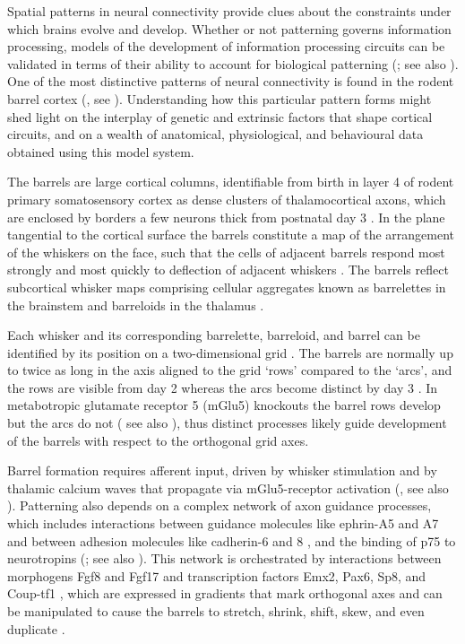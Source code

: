 \documentclass[a4paper,11pt]{article}
\begin{document}
Spatial patterns in neural connectivity provide clues about the constraints
under which brains evolve and develop. Whether or not patterning governs
information processing, models of the development of information processing
circuits can be validated in terms of their ability to account for biological
patterning (\citealp{purves_iterated_1992}; see also
\citealp{wilson_what_2015,bednar_cortical_2016}). One of the most distinctive patterns of
neural connectivity is found in the rodent barrel cortex
(\citealp{woolsey_pattern_1948,woolsey_structural_1970,welker_structure_1974}, see
\citealp{Fox2008}). Understanding how this particular pattern forms might shed
light on the interplay of genetic and extrinsic factors that shape cortical
circuits, and on a wealth of anatomical, physiological, and behavioural data
obtained using this model system.

The barrels are large cortical columns, identifiable from birth in layer 4 of
rodent primary somatosensory cortex as dense clusters of thalamocortical
axons, which are enclosed by borders a few neurons thick from postnatal day 3
\citep{Erzurumlu2012}. In the plane tangential to the cortical surface the
barrels constitute a map of the arrangement of the whiskers on the face, such
that the cells of adjacent barrels respond most strongly and most quickly to
deflection of adjacent whiskers \citep{Armstrong-James1992}. The barrels
reflect subcortical whisker maps comprising cellular aggregates known as
barrelettes in the brainstem and barreloids in the thalamus
\citep{Killackey1980}.

Each whisker and its corresponding barrelette, barreloid, and barrel can be
identified by its position on a two-dimensional grid
\citep{Zucker1969,Killackey1980,Loos1976}. The barrels are normally up to
twice as long in the axis aligned to the grid ‘rows’ compared to the ‘arcs’,
and the rows are visible from day 2 \citep{Rebsam2002} whereas the arcs become
distinct by day 3 \citep{Erzurumlu2012,Rebsam2002}. In metabotropic glutamate
receptor 5 (mGlu5) knockouts the barrel rows develop but the arcs do not
(\citealp{Hannan2001} see also \citealp{Fox2008}), thus distinct processes
likely guide development of the barrels with respect to the orthogonal grid
axes.

Barrel formation requires afferent input, driven by whisker stimulation and by
thalamic calcium waves that propagate via mGlu5-receptor activation
(\citealp{Anton2019}, see also \citealp{Anton2018}). Patterning also depends
on a complex network of axon guidance processes, which includes interactions
between guidance molecules like ephrin-A5 and A7 \citep{Miller2006} and
between adhesion molecules like cadherin-6 and 8 \citep{greig_molecular_2013,Bishop2000},
and the binding of p75 to neurotropins (\citealp{Shimogori2005,Bishop2002};
see also \citealp{Dye2011a,Dye2011b}). This network is orchestrated by
interactions between morphogens Fgf8 and Fgf17 and transcription factors Emx2,
Pax6, Sp8, and Coup-tf1 \citep{Shimogori2005,Bishop2000}, which are expressed
in gradients that mark orthogonal axes and can be manipulated to cause the
barrels to stretch, shrink, shift, skew, and even duplicate
\citep{Shimogori2005,Assimacopoulos2012,Borello2014,Sahara2007,Ypsilanti2016,Sur2005}.
\end{document}
